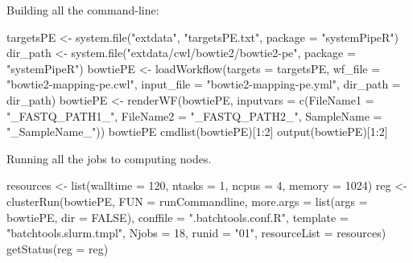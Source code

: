 \documentclass[14pt,]{article}
\newcommand{\hlnum}[1]{\textcolor[rgb]{0.816,0.125,0.439}{#1}}%
\newcommand{\hlstr}[1]{\textcolor[rgb]{0.251,0.627,0.251}{#1}}%
\newcommand{\hlstd}[1]{\textcolor[rgb]{0.251,0.251,0.251}{#1}}%
\newenvironment{Shaded}{\begin{myshaded}}{\end{myshaded}}
\newcommand{\DecValTok}[1]{\hlnum{#1}}
\newcommand{\ConstantTok}[1]{\hlnum{#1}}
\newcommand{\SpecialCharTok}[1]{\hlstr{#1}}
\newcommand{\StringTok}[1]{\hlstr{#1}}
\newcommand{\OtherTok}[1]{{#1}}
\newcommand{\FunctionTok}[1]{\hlstd{#1}}
\newcommand{\AttributeTok}[1]{{#1}}
\newcommand{\NormalTok}[1]{\hlstd{#1}}
\begin{document}
Building all the command-line:

\begin{Shaded}
\begin{Highlighting}[]
\NormalTok{targetsPE }\OtherTok{\textless{}{-}} \FunctionTok{system.file}\NormalTok{(}\StringTok{"extdata"}\NormalTok{, }\StringTok{"targetsPE.txt"}\NormalTok{, }\AttributeTok{package =} \StringTok{"systemPipeR"}\NormalTok{)}
\NormalTok{dir\_path }\OtherTok{\textless{}{-}} \FunctionTok{system.file}\NormalTok{(}\StringTok{"extdata/cwl/bowtie2/bowtie2{-}pe"}\NormalTok{, }\AttributeTok{package =} \StringTok{"systemPipeR"}\NormalTok{)}
\NormalTok{bowtiePE }\OtherTok{\textless{}{-}} \FunctionTok{loadWorkflow}\NormalTok{(}\AttributeTok{targets =}\NormalTok{ targetsPE, }\AttributeTok{wf\_file =} \StringTok{"bowtie2{-}mapping{-}pe.cwl"}\NormalTok{, }
    \AttributeTok{input\_file =} \StringTok{"bowtie2{-}mapping{-}pe.yml"}\NormalTok{, }\AttributeTok{dir\_path =}\NormalTok{ dir\_path)}
\NormalTok{bowtiePE }\OtherTok{\textless{}{-}} \FunctionTok{renderWF}\NormalTok{(bowtiePE, }\AttributeTok{inputvars =} \FunctionTok{c}\NormalTok{(}\AttributeTok{FileName1 =} \StringTok{"\_FASTQ\_PATH1\_"}\NormalTok{, }\AttributeTok{FileName2 =} \StringTok{"\_FASTQ\_PATH2\_"}\NormalTok{, }
    \AttributeTok{SampleName =} \StringTok{"\_SampleName\_"}\NormalTok{))}
\NormalTok{bowtiePE}
\FunctionTok{cmdlist}\NormalTok{(bowtiePE)[}\DecValTok{1}\SpecialCharTok{:}\DecValTok{2}\NormalTok{]}
\FunctionTok{output}\NormalTok{(bowtiePE)[}\DecValTok{1}\SpecialCharTok{:}\DecValTok{2}\NormalTok{]}
\end{Highlighting}
\end{Shaded}

Running all the jobs to computing nodes.

\begin{Shaded}
\begin{Highlighting}[]
\NormalTok{resources }\OtherTok{\textless{}{-}} \FunctionTok{list}\NormalTok{(}\AttributeTok{walltime =} \DecValTok{120}\NormalTok{, }\AttributeTok{ntasks =} \DecValTok{1}\NormalTok{, }\AttributeTok{ncpus =} \DecValTok{4}\NormalTok{, }\AttributeTok{memory =} \DecValTok{1024}\NormalTok{)}
\NormalTok{reg }\OtherTok{\textless{}{-}} \FunctionTok{clusterRun}\NormalTok{(bowtiePE, }\AttributeTok{FUN =}\NormalTok{ runCommandline, }\AttributeTok{more.args =} \FunctionTok{list}\NormalTok{(}\AttributeTok{args =}\NormalTok{ bowtiePE, }
    \AttributeTok{dir =} \ConstantTok{FALSE}\NormalTok{), }\AttributeTok{conffile =} \StringTok{".batchtools.conf.R"}\NormalTok{, }\AttributeTok{template =} \StringTok{"batchtools.slurm.tmpl"}\NormalTok{, }
    \AttributeTok{Njobs =} \DecValTok{18}\NormalTok{, }\AttributeTok{runid =} \StringTok{"01"}\NormalTok{, }\AttributeTok{resourceList =}\NormalTok{ resources)}
\FunctionTok{getStatus}\NormalTok{(}\AttributeTok{reg =}\NormalTok{ reg)}
\end{Highlighting}
\end{Shaded}
\end{document}

